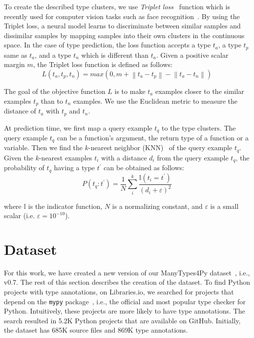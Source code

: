 To create the described type clusters, we use \textit{Triplet loss}~\cite{cheng2016person} function which is recently used for computer vision tasks such as face recognition~\cite{cheng2016person}. By using the Triplet loss, a neural model learns to discriminate between similar samples and dissimilar samples by mapping samples into their own clusters in the continuous space. In the case of type prediction, the loss function accepts a type $t_{a}$, a type $t_{p}$ same as $t_{a}$, and a type $t_{n}$ which is different than $t_{a}$. Given a positive scalar margin $m$, the Triplet loss function is defined as follows:
\begin{equation}\label{eq:triplet}
L(t_{a}, t_{p}, t_{n}) = max(0, m + \left\| t_{a} - t_{p} \right\| - \left\| t_{a} - t_{n} \right\|)
\end{equation}

The goal of the objective function $L$ is to make $t_{a}$ examples closer to the similar examples $t_{p}$ than to $t_{n}$ examples. We use the Euclidean metric to measure the distance of $t_{a}$ with $t_{p}$ and $t_{n}$.

At prediction time, we first map a query example $t_{q}$ to the type clusters. The query example $t_{q}$ can be a function's argument, the return type of a function or a variable. Then we find the $k$-nearest neighbor (KNN)~\cite{cover1967nearest} of the query example $t_{q}$. Given the $k$-nearest examples $t_{i}$ with a distance $d_{i}$ from the query example $t_{q}$, the probability of $t_{q}$ having a type $t^{\prime}$ can be obtained as follows:
\begin{equation}
P(t_{q}: t^{\prime}) = \frac{1}{N} \sum\limits_{i}^{k}{\frac{\mathbb{I}(t_{i} = t^{\prime} )}{(d_{i} + \varepsilon)^{2} }}
\end{equation}

where $\mathbb{I}$ is the indicator function, $N$ is a normalizing constant, and $\varepsilon$ is a small scalar (i.e. $\varepsilon = 10^{-10}$).

\section{Dataset}\label{ch4:sec:data}
For this work, we have created a new version of our ManyTypes4Py dataset~\cite{mt4py2021}, i.e., v0.7. The rest of this section describes the creation of the dataset. To find Python projects with type annotations, on Libraries.io, we searched for projects that depend on the \texttt{mypy} package~\cite{mypy}, i.e., the official and most popular type checker for Python. Intuitively, these projects are more likely to have type annotations. The search resulted in 5.2K Python projects that are available on GitHub. Initially, the dataset has 685K source files and 869K type annotations.

